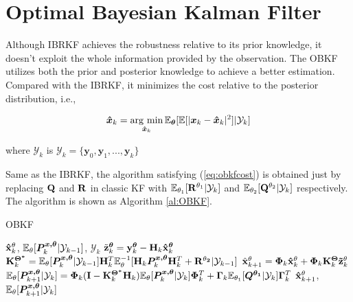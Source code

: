 \section{Optimal Bayesian Kalman Filter\label{sec: obkf}}

Although IBRKF achieves the robustness relative to its prior knowledge, it doesn't exploit the whole information provided by the observation. The OBKF utilizes both the prior and posterior knowledge to achieve a better estimation. Compared with the IBRKF, it minimizes the cost relative to the posterior distribution, i.e., 

\begin{align} \label{eq:obkfcost}
    \bm{\hat x}_k = \mathop{\rm arg~min}\limits_{\bm{\hat x}_k}\mathbb{E}_{\bm{\theta}}[\mathbb{E}[|\bm{x}_k-\bm{\hat x}_k|^2]|\mathcal{Y}_k]
\end{align}

where $\mathcal{Y}_k$ is $\mathcal{Y}_k=\{\bm{y}_0, \bm{y}_1, ..., \bm{y}_k\}$

Same as the IBRKF, the algorithm satisfying (\ref{eq:obkfcost}) is obtained just by replacing ${\bf Q}$ and ${\bf R}$ in classic KF with $\mathbb{E}_{\theta_1}[{\bf R}^{\theta_1}|\mathcal{Y}_k]$ and $\mathbb{E}_{\theta_2}[{\bf Q}^{\theta_2}|\mathcal{Y}_k]$ respectively. The algorithm is shown as Algorithm \ref{al:OBKF}.

\begin{algorithm}[]
\caption{OBKF}
\begin{algorithmic}[1]
    \label{al:OBKF}
\REQUIRE ${\bf \hat x}^{\theta}_k$, $\mathbb{E}_{\theta}[\bm{P^{x, \theta}}_{k}|\mathcal{Y}_{k-1}]$, $\mathcal{Y}_k$
\STATE $\tilde {\bf z}^{\bm{\theta}}_k = {\bf y}^{\bm{\theta}}_k - {\bf H}_k{\bf \hat x}^{\bm{\theta}}_k$
\STATE ${\bf K}^{\bm {\Theta^*}}_k = \mathbb{E}_{\theta}[\bm{P^{x, \theta}}_k|\mathcal{Y}_{k-1}]{\bf H}^T_k\mathbb{E}_{\theta}^{-1}[{\bf H}_k\bm{P^{x, \theta}}_k{\bf H}^T_k+{\bf R^{\theta_2}}|\mathcal{Y}_{k-1}]$
\STATE $\hat{\bf x}^{\theta}_{k+1} = {\bm {\Phi}}_k{\bf \hat x}^{\theta}_k+{\bm {\Phi}}_k{\bf K}^{\bm {\Theta}}_k{\bf \tilde z}^{\theta}_k$
\STATE $\mathbb{E}_{\theta}[\bm{P^{x, \theta}}_{k+1}|\mathcal{Y}_k] = \bm{\Phi}_k({\bf I}-{\bf K}^{\bm {\Theta^*}}_k{\bf H}_k)\mathbb{E}_{\theta}[\bm{P^{x, \theta}}_k|\mathcal{Y}_k]{\bm {\Phi}}^T_k + {\bm {\Gamma}}_k\mathbb{E}_{\theta_1}[{\bm {Q^{\theta_1}}}|\mathcal{Y}_k]{\bm {\Gamma}}_k^T$
\ENSURE ${\bf \hat x}^{\theta}_{k+1}$, $\mathbb{E}_{\theta}[\bm{P^{x, \theta}}_{k+1}|\mathcal{Y}_{k}]$
\end{algorithmic}
\end{algorithm}

